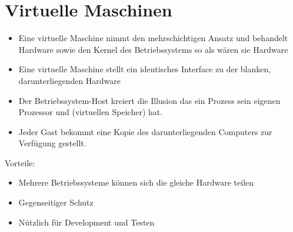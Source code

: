 \documentclass[a4paper]{scrreprt}
\begin{document}
\section{Virtuelle Maschinen}
	\begin{itemize}
		\item Eine virtuelle Maschine nimmt den mehrschichtigen Ansatz und behandelt Hardware sowie den Kernel des Betriebssystems so als wären sie Hardware
		\item Eine virtuelle Maschine stellt ein identisches Interface zu der blanken, darunterliegenden Hardware
		\item Der Betriebssystem-Host kreiert die Illusion das ein Prozess sein eigenen Prozessor und (virtuellen Speicher) hat.
		\item Jeder Gast bekommt eine Kopie des darunterliegenden Computers zur Verfügung gestellt.
	\end{itemize}
	Vorteile:
		\begin{itemize}
			\item Mehrere Betriebssysteme können sich die gleiche Hardware teilen
			\item Gegenseitiger Schutz
			\item Nützlich für Development und Testen
		\end{itemize}
\end{document}
